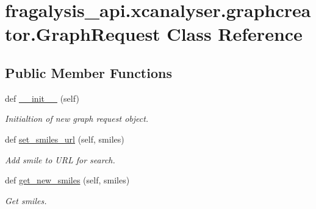 \hypertarget{classfragalysis__api_1_1xcanalyser_1_1graphcreator_1_1_graph_request}{}\section{fragalysis\+\_\+api.\+xcanalyser.\+graphcreator.\+Graph\+Request Class Reference}
\label{classfragalysis__api_1_1xcanalyser_1_1graphcreator_1_1_graph_request}
\subsection*{Public Member Functions}
\begin{DoxyCompactItemize}
\item 
def \hyperlink{classfragalysis__api_1_1xcanalyser_1_1graphcreator_1_1_graph_request_ac2cce029ca7a29dab5625823e2eb92c2}{\+\_\+\+\_\+init\+\_\+\+\_\+} (self)
\begin{DoxyCompactList}\small\item\em Initialtion of new graph request object. \end{DoxyCompactList}\item 
def \hyperlink{classfragalysis__api_1_1xcanalyser_1_1graphcreator_1_1_graph_request_ac47f4baba7c0cdefd43bb0c7e17646c9}{set\+\_\+smiles\+\_\+url} (self, smiles)
\begin{DoxyCompactList}\small\item\em Add smile to U\+RL for search. \end{DoxyCompactList}\item 
def \hyperlink{classfragalysis__api_1_1xcanalyser_1_1graphcreator_1_1_graph_request_a1ca3ed55492a1722ef0feb76c7fba43f}{get\+\_\+new\+\_\+smiles} (self, smiles)
\begin{DoxyCompactList}\small\item\em Get smiles. \end{DoxyCompactList}\end{DoxyCompactItemize}
